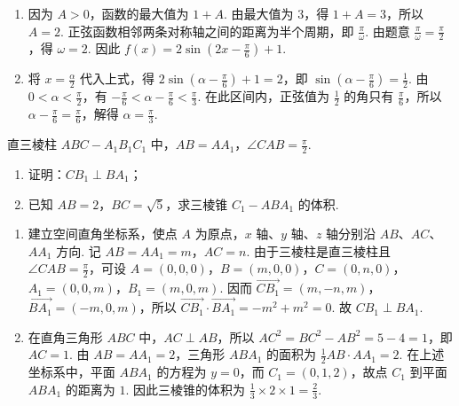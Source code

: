 \begin{solution}
\begin{enumerate}
\item 因为 \(A>0\)，函数的最大值为 \(1+A\). 由最大值为 \(3\)，得 \(1+A=3\)，所以 \(A=2\). 正弦函数相邻两条对称轴之间的距离为半个周期，即 \(\frac{\pi}{\omega}\). 由题意 \(\frac{\pi}{\omega}=\frac{\pi}{2}\)，得 \(\omega=2\). 因此 \(f(x)=2\sin\left(2x-\frac{\pi}{6}\right)+1\).

\item 将 \(x=\frac{\alpha}{2}\) 代入上式，得 \(2\sin\left(\alpha-\frac{\pi}{6}\right)+1=2\)，即 \(\sin\left(\alpha-\frac{\pi}{6}\right)=\frac{1}{2}\). 由 \(0<\alpha<\frac{\pi}{2}\)，有 \(-\frac{\pi}{6}<\alpha-\frac{\pi}{6}<\frac{\pi}{3}\). 在此区间内，正弦值为 \(\frac{1}{2}\) 的角只有 \(\frac{\pi}{6}\)，所以 \(\alpha-\frac{\pi}{6}=\frac{\pi}{6}\)，解得 \(\alpha=\frac{\pi}{3}\).
\end{enumerate}
\end{solution}

\begin{problem}
直三棱柱 \(ABC - A_1B_1C_1\) 中，\(AB = AA_1\)，\(\angle CAB = \frac{\pi}{2}\).

\begin{enumerate}
\item 证明：\(CB_1 \perp BA_1\)；
\item 已知 \(AB = 2\)，\(BC = \sqrt{5}\)，求三棱锥 \(C_1 - ABA_1\) 的体积.
\end{enumerate}

\begin{minipage}{\linewidth}
\centering
{}
\end{minipage}
\end{problem}

\begin{solution}
\begin{enumerate}
\item 建立空间直角坐标系，使点 \(A\) 为原点，\(x\) 轴、\(y\) 轴、\(z\) 轴分别沿 \(AB\)、\(AC\)、\(AA_1\) 方向. 记 \(AB=AA_1=m\)，\(AC=n\). 由于三棱柱是直三棱柱且 \(\angle CAB=\frac{\pi}{2}\)，可设
\(A=(0,0,0)\)，\(B=(m,0,0)\)，\(C=(0,n,0)\)，\(A_1=(0,0,m)\)，\(B_1=(m,0,m)\). 因而 \(\overrightarrow{CB_1}=(m,-n,m)\)，\(\overrightarrow{BA_1}=(-m,0,m)\)，所以
\(\overrightarrow{CB_1}\cdot\overrightarrow{BA_1}=-m^2+m^2=0\). 故 \(CB_1\perp BA_1\).

\item 在直角三角形 \(ABC\) 中，\(AC\perp AB\)，所以 \(AC^2=BC^2-AB^2=5-4=1\)，即 \(AC=1\). 由 \(AB=AA_1=2\)，三角形 \(ABA_1\) 的面积为 \(\frac{1}{2}AB\cdot AA_1=2\). 在上述坐标系中，平面 \(ABA_1\) 的方程为 \(y=0\)，而 \(C_1=(0,1,2)\)，故点 \(C_1\) 到平面 \(ABA_1\) 的距离为 \(1\). 因此三棱锥的体积为 \(\frac{1}{3}\times2\times1=\frac{2}{3}\).
\end{enumerate}
\end{solution}

